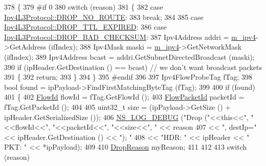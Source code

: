 \begin{DoxyCode}
378 \{
379 \textcolor{preprocessor}{#if 0}
380   \textcolor{keywordflow}{switch} (reason)
381     \{
382     \textcolor{keywordflow}{case} \hyperlink{classns3_1_1Ipv4L3Protocol_a05e7403d60c79529257c4cffdd994da1a6934d63c397ae1ec077fdfcdeb90eb40}{Ipv4L3Protocol::DROP\_NO\_ROUTE}:
383       \textcolor{keywordflow}{break};
384 
385     \textcolor{keywordflow}{case} \hyperlink{classns3_1_1Ipv4L3Protocol_a05e7403d60c79529257c4cffdd994da1a95ecb5b7c1affd7ca7a6d3d34c38cd40}{Ipv4L3Protocol::DROP\_TTL\_EXPIRED}:
386     \textcolor{keywordflow}{case} \hyperlink{classns3_1_1Ipv4L3Protocol_a05e7403d60c79529257c4cffdd994da1a14938788d12f864657e5a3aa5d3e26fd}{Ipv4L3Protocol::DROP\_BAD\_CHECKSUM}:
387       Ipv4Address addri = \hyperlink{classns3_1_1Ipv4FlowProbe_a8902eb4356b3e4a0f91b9031f80c8802}{m\_ipv4}->GetAddress (ifIndex);
388       Ipv4Mask maski = \hyperlink{classns3_1_1Ipv4FlowProbe_a8902eb4356b3e4a0f91b9031f80c8802}{m\_ipv4}->GetNetworkMask (ifIndex);
389       Ipv4Address bcast = addri.GetSubnetDirectedBroadcast (maski);
390       \textcolor{keywordflow}{if} (ipHeader.GetDestination () == bcast) \textcolor{comment}{// we don't want broadcast packets}
391         \{
392           \textcolor{keywordflow}{return};
393         \}
394     \}
395 \textcolor{preprocessor}{#endif}
396 
397   Ipv4FlowProbeTag fTag;
398   \textcolor{keywordtype}{bool} found = ipPayload->FindFirstMatchingByteTag (fTag);
399 
400   \textcolor{keywordflow}{if} (found)
401     \{
402       \hyperlink{group__flow-monitor_ga39a766c4a370cdb9ab8ac85da4b288e9}{FlowId} flowId = fTag.GetFlowId ();
403       \hyperlink{group__flow-monitor_gaa1cb18250e1672975204f1254b8aa2ae}{FlowPacketId} packetId = fTag.GetPacketId ();
404 
405       uint32\_t size = (ipPayload->GetSize () + ipHeader.GetSerializedSize ());
406       \hyperlink{group__logging_ga413f1886406d49f59a6a0a89b77b4d0a}{NS\_LOG\_DEBUG} (\textcolor{stringliteral}{"Drop ("}<<\textcolor{keyword}{this}<<\textcolor{stringliteral}{", "}<<flowId<<\textcolor{stringliteral}{", "}<<packetId<<\textcolor{stringliteral}{", "}<<size<<\textcolor{stringliteral}{", "} << reason 
407                             << \textcolor{stringliteral}{", destIp="} << ipHeader.GetDestination () << \textcolor{stringliteral}{"); "}
408                             << \textcolor{stringliteral}{"HDR: "} << ipHeader << \textcolor{stringliteral}{" PKT: "} << *ipPayload);
409 
410       \hyperlink{classns3_1_1Ipv4FlowProbe_a035ac54633cca2eec144e14f0dcf4179}{DropReason} myReason;
411 
412 
413       \textcolor{keywordflow}{switch} (reason)

\end{DoxyCode}
